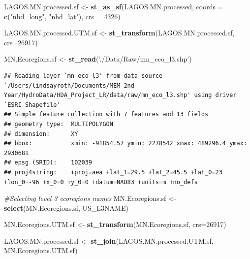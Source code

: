 \documentclass[12pt,]{article}
\newenvironment{Shaded}{\begin{snugshade}}{\end{snugshade}}
\newcommand{\CommentTok}[1]{\textcolor[rgb]{0.56,0.35,0.01}{\textit{#1}}}
\newcommand{\DataTypeTok}[1]{\textcolor[rgb]{0.13,0.29,0.53}{#1}}
\newcommand{\DecValTok}[1]{\textcolor[rgb]{0.00,0.00,0.81}{#1}}
\newcommand{\KeywordTok}[1]{\textcolor[rgb]{0.13,0.29,0.53}{\textbf{#1}}}
\newcommand{\NormalTok}[1]{#1}
\newcommand{\StringTok}[1]{\textcolor[rgb]{0.31,0.60,0.02}{#1}}
\begin{document}
\begin{Shaded}
\begin{Highlighting}[]
\NormalTok{LAGOS.MN.processed.sf <-}\StringTok{ }\KeywordTok{st_as_sf}\NormalTok{(LAGOS.MN.processed, }
                                  \DataTypeTok{coords =} \KeywordTok{c}\NormalTok{(}\StringTok{"nhd_long"}\NormalTok{, }\StringTok{"nhd_lat"}\NormalTok{), }\DataTypeTok{crs =} \DecValTok{4326}\NormalTok{)}

\NormalTok{LAGOS.MN.processed.UTM.sf <-}\StringTok{ }\KeywordTok{st_transform}\NormalTok{(LAGOS.MN.processed.sf, }\DataTypeTok{crs=}\DecValTok{26917}\NormalTok{)}

\NormalTok{MN.Ecoregions.sf <-}\StringTok{ }\KeywordTok{st_read}\NormalTok{(}\StringTok{'./Data/Raw/mn_eco_l3.shp'}\NormalTok{)}
\end{Highlighting}
\end{Shaded}

\begin{verbatim}
## Reading layer `mn_eco_l3' from data source `/Users/lindsayroth/Documents/MEM 2nd Year/HydroData/HDA_Project_LR/data/raw/mn_eco_l3.shp' using driver `ESRI Shapefile'
## Simple feature collection with 7 features and 13 fields
## geometry type:  MULTIPOLYGON
## dimension:      XY
## bbox:           xmin: -91854.57 ymin: 2278542 xmax: 489296.4 ymax: 2930681
## epsg (SRID):    102039
## proj4string:    +proj=aea +lat_1=29.5 +lat_2=45.5 +lat_0=23 +lon_0=-96 +x_0=0 +y_0=0 +datum=NAD83 +units=m +no_defs
\end{verbatim}

\begin{Shaded}
\begin{Highlighting}[]
\CommentTok{#Selecting level 3 ecoregions names}
\NormalTok{MN.Ecoregions.sf <-}\StringTok{ }\KeywordTok{select}\NormalTok{(MN.Ecoregions.sf, US_L3NAME)}

\NormalTok{MN.Ecoregions.UTM.sf <-}\StringTok{ }\KeywordTok{st_transform}\NormalTok{(MN.Ecoregions.sf, }\DataTypeTok{crs=}\DecValTok{26917}\NormalTok{)}

\NormalTok{LAGOS.MN.processed.sf <-}\StringTok{ }\KeywordTok{st_join}\NormalTok{(LAGOS.MN.processed.UTM.sf, MN.Ecoregions.UTM.sf)}
\end{Highlighting}
\end{Shaded}
\end{document}
